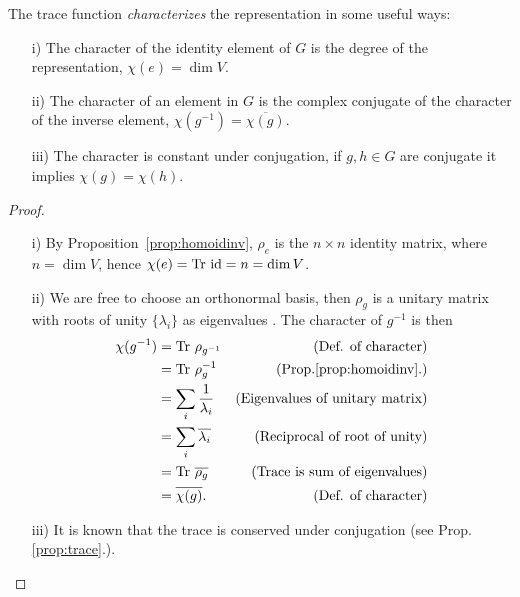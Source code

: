 \begin{proposition}\cite[Prop.2.1.]{Serre}\label{prop:charidinvconj}
	The trace function \emph{characterizes} the representation in some useful ways:
	\begin{enumerate}
		\item[i)] The character of the identity element of $G$ is the degree of the representation, $\chi(e) = \dim V$.
		\item[ii)] The character of an element in $G$ is the complex conjugate of the character of the inverse element, $\chi(g^{-1}) = \overline{\chi(g)}$.
		\item[iii)] The character is constant under conjugation, if $g,h\in G$ are conjugate it implies $\chi(g) = \chi(h)$.
	\end{enumerate}
\end{proposition}
\begin{proof}
	\begin{enumerate}
		\item[i)] By Proposition~\ref{prop:homoidinv}, $\rho_e$ is the $n \times n$ identity matrix, where $n = \dim V$, hence $\chi(e) = \text{Tr } \text{id} = n = \dim V$.
		\item[ii)] We are free to choose an orthonormal basis, then $\rho_g$ is a unitary matrix with roots of unity $\{\lambda_i\}$ as eigenvalues \cite[Exercise.8.6.15.]{Nicholson}. The character of $g^{-1}$ is then
		\begin{align*}
			\chi(g^{-1}) &= \text{Tr } \rho_{g^{-1}} & \text{(Def. of character)} \\
			&= \text{Tr } \rho_g^{-1} & \text{(Prop.\ref{prop:homoidinv}.)} \\
			&= \sum_i \frac{1}{\lambda_i} & \text{(Eigenvalues of unitary matrix)} \\
			&= \sum_i \overline{\lambda_i} & \text{(Reciprocal of root of unity)} \\
			&= \text{Tr } \overline{\rho_g} & \text{(Trace is sum of eigenvalues)} \\
			&= \overline{\chi(g)}. & \text{(Def. of character)}
		\end{align*}
		\item[iii)] It is known that the trace is conserved under conjugation (see Prop.\ref{prop:trace}.).\qedhere
	\end{enumerate}
\end{proof}

